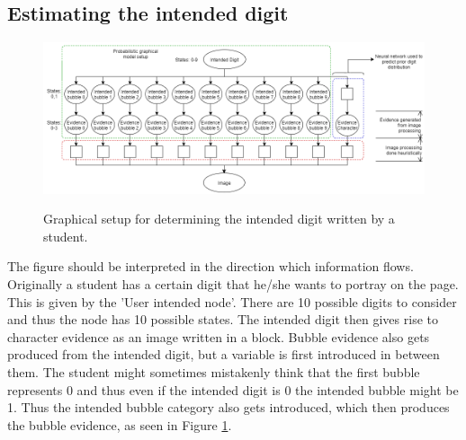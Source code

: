 \subsection{Estimating the intended digit}
\label{sec:intendedDigit}

\begin{figure}
  \centering
  \includegraphics[width=16cm]{pgmDigit}\\
  \caption{Graphical setup for determining the intended digit written by a student.}
  \label{fig:pgmDigit}
\end{figure}

The figure should be interpreted in the direction which information flows. Originally a student has a certain digit that he/she wants to portray on the page. This is given by the 'User intended node'. There are 10 possible digits to consider and thus the node has 10 possible states. The intended digit then gives rise to character evidence as an image written in a block. Bubble evidence also gets produced from the intended digit, but a variable is first introduced in between them. The student might sometimes mistakenly think that the first bubble represents 0 and thus even if the intended digit is 0 the intended bubble might be 1. Thus the intended bubble category also gets introduced, which then produces the bubble evidence, as seen in Figure \ref{fig:pgmDigit}.  



